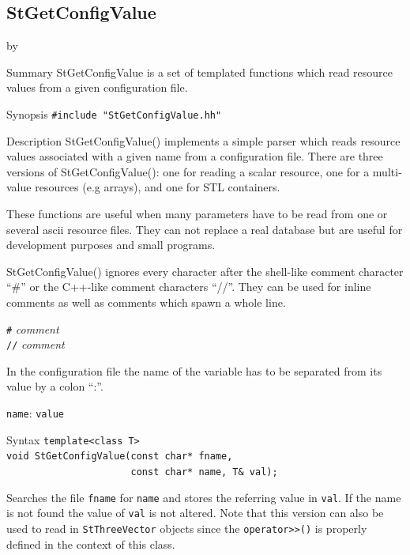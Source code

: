 \documentclass[twoside]{article}
\newcommand{\comp}[1]{\texttt{#1}}%
\newcommand{\args}[1]{\textit{#1}}%
\newcommand{\entrylabel}[1]{\mbox{\textbf{{#1}}}\hfil}%
\newenvironment{entry}
{\begin{list}{}%
    {\renewcommand{\makelabel}{\entrylabel}%
     \setlength{\labelwidth}{90pt}%
     \setlength{\leftmargin}{\labelwidth}
     \advance\leftmargin by \labelsep%
      }%
    }%
  {\end{list}}
\newcommand{\Entrylabel}[1]%
{\raisebox{0pt}[1ex][0pt]{\makebox[\labelwidth][l]%
    {\parbox[t]{\labelwidth}{\hspace{0pt}\textbf{{#1}}}}}}
\newenvironment{Entry}%
{\renewcommand{\entrylabel}{\Entrylabel}\begin{entry}}%
  {\end{entry}}
\begin{document}
\clearpage

%
%
\subsection{StGetConfigValue }
\begin{Entry}
\item[Summary]
    StGetConfigValue is a set of templated functions which read
    resource values from a given configuration file.
    
\item[Synopsis]
    \verb+#include "StGetConfigValue.hh"+
    
  
\item[Description]
    StGetConfigValue() implements a simple parser which reads resource values associated
    with a given name from a configuration file.
    There are three versions of StGetConfigValue(): one for
    reading a scalar resource, one for a multi-value
    resources (e.g arrays), and one for STL containers. 

    These functions are useful when many parameters have to be read from
    one or several ascii resource files. They can not replace a real database but
    are useful for development purposes and small programs.

    StGetConfigValue() ignores every character after the shell-like comment character ``\#''
    or the C++-like comment characters ``//''. They can be used for inline comments
    as well as comments which spawn a whole line.
    
    \comp{\#} \args{comment}\\
    \comp{//} \args{comment}

    In the configuration file the name of the variable has to be separated from its value
    by a colon ``:''.
    
    \comp{name}: \comp{value}
    
\item[Syntax]
    \verb+template<class T>+\\
    \verb+void StGetConfigValue(const char* fname,+\\
    \verb+                      const char* name, T& val);+
    
    Searches the file \comp{fname} for \comp{name} and stores
    the referring value in \comp{val}. If the name is not found the value of
    \comp{val} is not altered. Note that this version can also be used to read in
    \comp{StThreeVector} objects since the \verb+operator>>()+ is properly defined in the
    context of this class.
        

\end{Entry}
\end{document}
